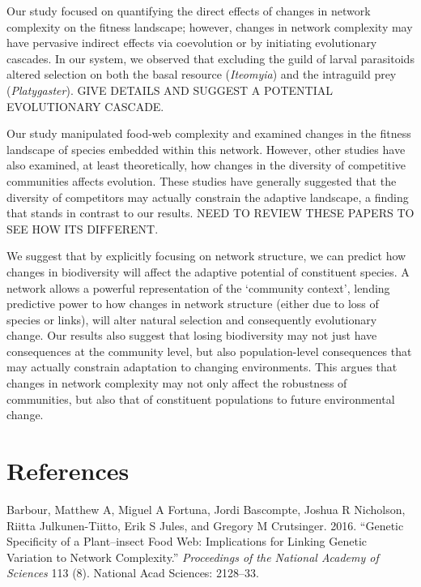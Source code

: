 \documentclass[]{elsarticle} %
\begin{document}
Our study focused on quantifying the direct effects of changes in
network complexity on the fitness landscape; however, changes in network
complexity may have pervasive indirect effects via coevolution or by
initiating evolutionary cascades. In our system, we observed that
excluding the guild of larval parasitoids altered selection on both the
basal resource (\emph{Iteomyia}) and the intraguild prey
(\emph{Platygaster}). GIVE DETAILS AND SUGGEST A POTENTIAL EVOLUTIONARY
CASCADE.

Our study manipulated food-web complexity and examined changes in the
fitness landscape of species embedded within this network. However,
other studies have also examined, at least theoretically, how changes in
the diversity of competitive communities affects evolution. These
studies have generally suggested that the diversity of competitors may
actually constrain the adaptive landscape, a finding that stands in
contrast to our results. NEED TO REVIEW THESE PAPERS TO SEE HOW ITS
DIFFERENT.

We suggest that by explicitly focusing on network structure, we can
predict how changes in biodiversity will affect the adaptive potential
of constituent species. A network allows a powerful representation of
the `community context', lending predictive power to how changes in
network structure (either due to loss of species or links), will alter
natural selection and consequently evolutionary change. Our results also
suggest that losing biodiversity may not just have consequences at the
community level, but also population-level consequences that may
actually constrain adaptation to changing environments. This argues that
changes in network complexity may not only affect the robustness of
communities, but also that of constituent populations to future
environmental change.

\section*{References}\label{references}

\hypertarget{refs}{}
\hypertarget{ref-Barbour2016}{}
Barbour, Matthew A, Miguel A Fortuna, Jordi Bascompte, Joshua R
Nicholson, Riitta Julkunen-Tiitto, Erik S Jules, and Gregory M
Crutsinger. 2016. ``Genetic Specificity of a Plant--insect Food Web:
Implications for Linking Genetic Variation to Network Complexity.''
\emph{Proceedings of the National Academy of Sciences} 113 (8). National
Acad Sciences: 2128--33.
\end{document}
